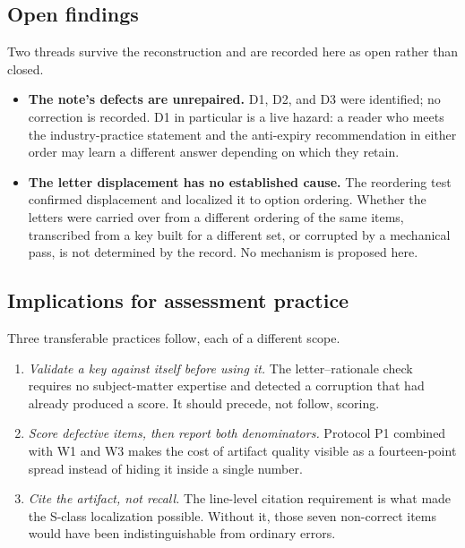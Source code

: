 \documentclass[11pt]{article}
\begin{document}
\subsection{Open findings}

Two threads survive the reconstruction and are recorded here as open rather
than closed.

\begin{itemize}
\item \textbf{The note's defects are unrepaired.} D1, D2, and D3 were
      identified; no correction is recorded. D1 in particular is a live
      hazard: a reader who meets the industry-practice statement and the
      anti-expiry recommendation in either order may learn a different
      answer depending on which they retain.
\item \textbf{The letter displacement has no established cause.} The
      reordering test confirmed displacement and localized it to option
      ordering. Whether the letters were carried over from a different
      ordering of the same items, transcribed from a key built for a
      different set, or corrupted by a mechanical pass, is not determined
      by the record. No mechanism is proposed here.
\end{itemize}

\subsection{Implications for assessment practice}

Three transferable practices follow, each of a different scope.

\begin{enumerate}
\item \emph{Validate a key against itself before using it.} The
      letter--rationale check requires no subject-matter expertise and
      detected a corruption that had already produced a score. It should
      precede, not follow, scoring.
\item \emph{Score defective items, then report both denominators.} Protocol
      P1 combined with W1 and W3 makes the cost of artifact quality
      visible as a fourteen-point spread instead of hiding it inside a
      single number.
\item \emph{Cite the artifact, not recall.} The line-level citation
      requirement is what made the S-class localization possible. Without
      it, those seven non-correct items would have been indistinguishable
      from ordinary errors.
\end{enumerate}
\end{document}
